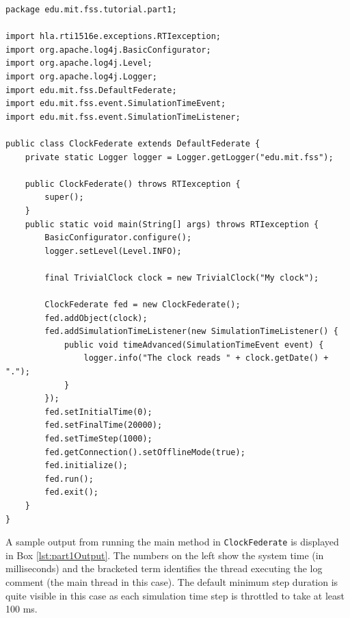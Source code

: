 \documentclass[]{article}
\begin{document}
\begin{Code}
\begin{lstlisting}[caption={ClockFederate object class},label={lst:clockFederate}]
package edu.mit.fss.tutorial.part1;

import hla.rti1516e.exceptions.RTIexception;
import org.apache.log4j.BasicConfigurator;
import org.apache.log4j.Level;
import org.apache.log4j.Logger;
import edu.mit.fss.DefaultFederate;
import edu.mit.fss.event.SimulationTimeEvent;
import edu.mit.fss.event.SimulationTimeListener;

public class ClockFederate extends DefaultFederate {
	private static Logger logger = Logger.getLogger("edu.mit.fss");

	public ClockFederate() throws RTIexception {
		super();
	}
	public static void main(String[] args) throws RTIexception {
		BasicConfigurator.configure();
		logger.setLevel(Level.INFO);
		
		final TrivialClock clock = new TrivialClock("My clock");
		
		ClockFederate fed = new ClockFederate();
		fed.addObject(clock);
		fed.addSimulationTimeListener(new SimulationTimeListener() {
			public void timeAdvanced(SimulationTimeEvent event) {
				logger.info("The clock reads " + clock.getDate() + ".");
			}
		});
		fed.setInitialTime(0);
		fed.setFinalTime(20000);
		fed.setTimeStep(1000);
		fed.getConnection().setOfflineMode(true);
		fed.initialize();
		fed.run();
		fed.exit();
	}
}
\end{lstlisting}
\end{Code}

A sample output from running the main method in \texttt{ClockFederate} is displayed in Box \ref{lst:part1Output}. The numbers on the left show the system time (in milliseconds) and the bracketed term identifies the thread executing the log comment (the main thread in this case). The default minimum step duration is quite visible in this case as each simulation time step is throttled to take at least 100 ms.
\end{document}
